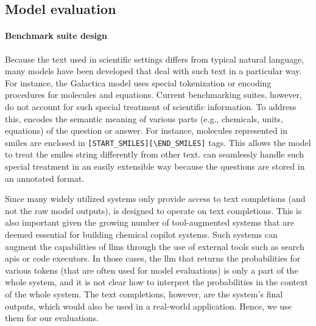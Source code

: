 \documentclass[11pt, oneside]{article}
\begin{document}
\begin{refsection}
\subsection{Model evaluation}

\paragraph{Benchmark suite design} Because the text used in scientific settings differs from typical natural language, many models have been developed that deal with such text in a particular way.
For instance, the Galactica model\autocite{taylor2022galactica} uses special tokenization or encoding procedures for molecules and equations. 
Current benchmarking suites, however, do not account for such special treatment of scientific information.
To address this, \chembench encodes the semantic meaning of various parts (e.g., chemicals, units, equations) of the question or answer.  
For instance, molecules represented in \gls{smiles} are enclosed in \texttt{[START\_SMILES][\textbackslash END\_SMILES]} tags. 
This allows the model to treat the \gls{smiles} string differently from other text. 
\chembench can seamlessly handle such special treatment in an easily extensible way because the questions are stored in an annotated format.

Since many widely utilized systems only provide access to text completions (and not the raw model outputs), \chembench is designed to operate on text completions.
This is also important given the growing number of tool-augmented systems that are deemed essential for building chemical copilot systems.
Such systems can augment the capabilities of \glspl{llm} through the use of external tools such as search \glspl{api} or code executors.\autocite{schick2024toolformer, karpas2022mrkl, yao2022react}
In those cases, the \gls{llm} that returns the probabilities for various tokens (that are often used for model evaluations\autocite{Fourrier_Habib_Launay_Wolf}) is only a part of the whole system, and it is not clear how to interpret the probabilities in the context of the whole system.
The text completions, however, are the system's final outputs, which would also be used in a real-world application. 
Hence, we use them for our evaluations.\autocite{xiong2023llms}


\end{refsection}
\end{document}
